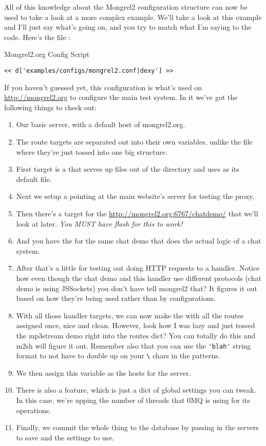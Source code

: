 All of this knowledge about the Mongrel2 configuration structure can now be used to take a look at
a more complex example.  We'll take a look at this example and I'll just say what's
going on, and you try to match what I'm saying to the code.  Here's the file :

\begin{code}{Mongrel2.org Config Script}
\begin{lstlisting}
<< d['examples/configs/mongrel2.conf|dexy'] >>
\end{lstlisting}
\end{code}

If you haven't guessed yet, this configuration is what's used on \url{http://mongrel2.org}
to configure the main test system.  In it we've got the following things to check out:

\begin{enumerate}
\item Our basic server, with a default host of mongrel2.org.
\item The route targets are separated out into their own variables, unlike the  file
    where they're just tossed into one big structure.
\item First target is a  that serves up files out of the  directory and uses 
    as its default file.
\item Next we setup a  pointing at the main website's server for testing the proxy.
\item Then there's a  target for the \url{http://mongrel2.org:6767/chatdemo/} that we'll look at later. \emph{You MUST have flash for this to work!}
\item And you have the  for the same chat demo that does the actual logic of a chat system.
\item After that's a little  for testing out doing HTTP requests to a handler.  Notice how even
    though the chat demo and this handler use different protocols (chat demo is using JSSockets) you don't have
    tell mongrel2 that?  It figures it out based on how they're being used rather than by configurations.
\item With all those handler targets, we can now make the   with all the routes
    assigned once, nice and clean.  However, look how I was lazy and just tossed the mp3stream demo
    right into the routes dict?  You can totally do this and m2sh will figure it out.  Remember also that
    you can use the \verb|'blah'| string format to not have to double up on your \verb|\| chars in the patterns.
\item We then assign this  variable as the hosts for the  server.
\item There is also a  feature, which is just a dict of global settings you can tweak.  In this case,
    we're upping the number of threads that 0MQ is using for its operations.
\item Finally, we commit the whole thing to the database by passing in the servers to save and the settings
    to use.
\end{enumerate}

